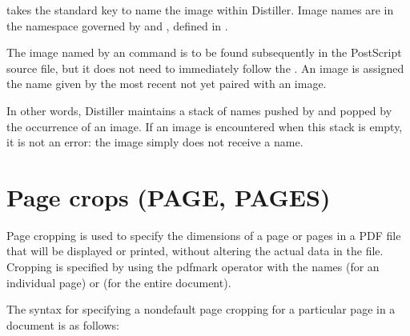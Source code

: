 \documentclass[letterpaper,12pt,english,openany,oneside]{sphinxmanual}
\begin{document}
\begin{sphinxVerbatim}[commandchars=\\\{\}]
 \PYG{p}{[}  
  
\end{sphinxVerbatim}

 takes the standard  key to name the image within Distiller. Image names are in the namespace governed by  and  , defined in .

The image named by an  command is to be found subsequently in the PostScript source file, but it does not need to immediately follow the  . An image is assigned the name given by the most recent  not yet paired with an image.

In other words, Distiller maintains a stack of names pushed by  and popped by the occurrence of an image. If an image is encountered when this stack is empty, it is not an error: the image simply does not receive a name.


\section{Page crops (PAGE, PAGES)}
\label{\detokenize{pdfmark_Basic:page-crops-page-pages}}
Page cropping is used to specify the dimensions of a page or pages in a PDF file that will be displayed or printed, without altering the actual data in the file. Cropping is specified by using the pdfmark operator with the names  (for an individual page) or  (for the entire document).

The syntax for specifying a non\sphinxhyphen{}default page cropping for a particular page in a document is as follows:

\begin{sphinxVerbatim}[commandchars=\\\{\}]
 \PYG{p}{[}  \PYG{p}{[}
   
\PYG{p}{]}

  
\end{sphinxVerbatim}
\end{document}
